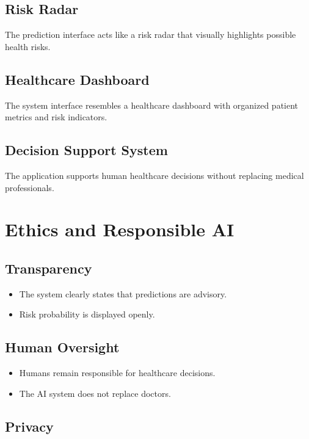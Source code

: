 \documentclass[12pt]{article}
\begin{document}
\subsection*{Risk Radar}

The prediction interface acts like a risk radar that visually highlights possible health risks.

\subsection*{Healthcare Dashboard}

The system interface resembles a healthcare dashboard with organized patient metrics and risk indicators.

\subsection*{Decision Support System}

The application supports human healthcare decisions without replacing medical professionals.

\section*{Ethics and Responsible AI}

\subsection*{Transparency}

\begin{itemize}
    \item The system clearly states that predictions are advisory.
    \item Risk probability is displayed openly.
\end{itemize}

\subsection*{Human Oversight}

\begin{itemize}
    \item Humans remain responsible for healthcare decisions.
    \item The AI system does not replace doctors.
\end{itemize}

\subsection*{Privacy}
\end{document}
